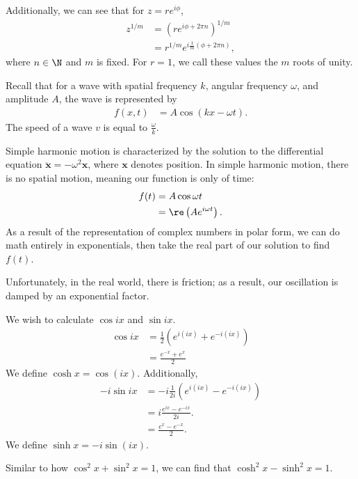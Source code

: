 \documentclass[10pt]{mypackage}
\begin{document}
Additionally, we can see that for $z = re^{i\phi}$,
\begin{align*}
  z^{1/m} &= \left(re^{i\phi + 2\pi n}\right)^{1/m}\\
          &= r^{1/m}e^{i\frac{1}{m}\left(\phi + 2\pi n\right)},
\end{align*}
where $n\in \N$ and $m$ is fixed. For $r = 1$, we call these values the $m$ roots of unity.
\begin{example}
  Recall that for a wave with spatial frequency $k$, angular frequency $\omega$, and amplitude $A$, the wave is represented by
  \begin{align*}
    f(x,t) &= A\cos\left(kx - \omega t\right).
  \end{align*}
  The speed of a wave $v$ is equal to $\frac{\omega}{k}$.\newline

  Simple harmonic motion is characterized by the solution to the differential equation $\ddot{\mathbf{x}} = -\omega^2 \mathbf{x}$, where $\mathbf{x}$ denotes position. In simple harmonic motion, there is no spatial motion, meaning our function is only of time:
  \begin{align*}
    f(t) &= A\cos \omega t\\
         &= \re\left(Ae^{i\omega t}\right).
  \end{align*}
  As a result of the representation of complex numbers in polar form, we can do math entirely in exponentials, then take the real part of our solution to find $f(t)$.\newline

  Unfortunately, in the real world, there is friction; as a result, our oscillation is damped by an exponential factor.
\end{example}
\begin{example}
  We wish to calculate $\cos ix$ and $\sin ix$.
  \begin{align*}
    \cos ix &= \frac{1}{2}\left(e^{i\left(ix\right)} + e^{-i\left(ix\right)}\right)\\
            &= \frac{e^{-x} + e^{x}}{2}
  \end{align*}
  We define $\cosh x = \cos \left(ix\right)$. Additionally,
  \begin{align*}
    - i\sin ix &= -i\frac{1}{2i}\left(e^{i\left(ix\right)} - e^{-i\left(ix\right)}\right)\\
            &= i\frac{e^{ix} - e^{-ix}}{2i}.\\
            &= \frac{e^{x} - e^{-x}}{2}.
  \end{align*}
  We define $\sinh x = -i\sin\left(ix\right)$.\newline

  Similar to how $\cos^2 x + \sin^2 x = 1$, we can find that $\cosh^2 x - \sinh^2 x = 1$.
\end{example}
\end{document}
